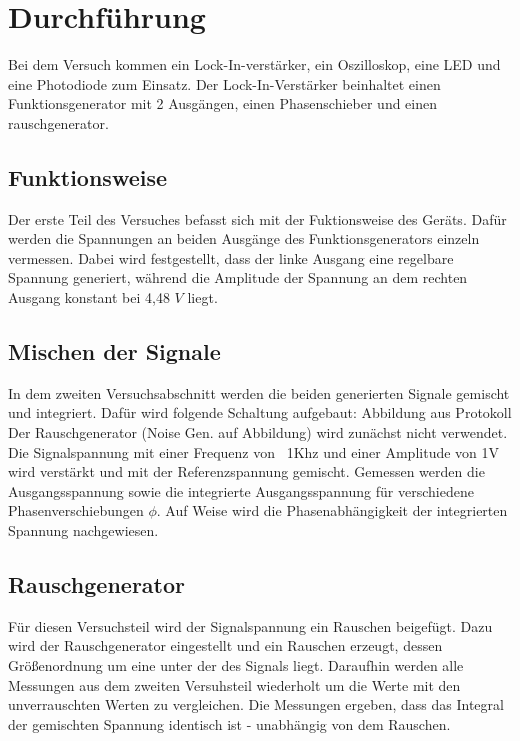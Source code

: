 \section{Durchführung}
\label{sec:Durchführung}

Bei dem Versuch kommen ein Lock-In-verstärker, ein Oszilloskop, eine
LED und eine Photodiode zum Einsatz. Der Lock-In-Verstärker beinhaltet
einen Funktionsgenerator  mit 2 Ausgängen, einen Phasenschieber und einen
rauschgenerator.

\subsection{Funktionsweise}
Der erste Teil des Versuches befasst sich mit der Fuktionsweise des Geräts.
Dafür werden die Spannungen an beiden Ausgänge des Funktionsgenerators einzeln
vermessen. Dabei wird festgestellt, dass der linke Ausgang eine regelbare
Spannung generiert, während die Amplitude der Spannung an dem rechten
Ausgang konstant bei 4,48 $V$ liegt.

\subsection{Mischen der Signale}
In dem zweiten Versuchsabschnitt werden die beiden generierten Signale gemischt
und integriert. Dafür wird folgende Schaltung aufgebaut:
Abbildung aus Protokoll
Der Rauschgenerator (Noise Gen. auf Abbildung) wird zunächst nicht verwendet.
Die Signalspannung mit einer Frequenz von ~1Khz und einer Amplitude von 1V
wird verstärkt und mit der
Referenzspannung gemischt. Gemessen werden die Ausgangsspannung sowie die
integrierte Ausgangsspannung für verschiedene Phasenverschiebungen $\phi$. Auf
Weise wird die Phasenabhängigkeit der integrierten Spannung nachgewiesen.

\subsection{Rauschgenerator}
Für diesen Versuchsteil wird der Signalspannung ein Rauschen beigefügt. Dazu
wird der Rauschgenerator eingestellt und ein Rauschen erzeugt, dessen
Größenordnung um eine unter der des Signals liegt. Daraufhin werden alle
Messungen aus dem zweiten Versuhsteil wiederholt um die Werte mit den
unverrauschten Werten zu vergleichen. Die Messungen ergeben, dass das Integral
der gemischten Spannung identisch ist - unabhängig von dem Rauschen.

